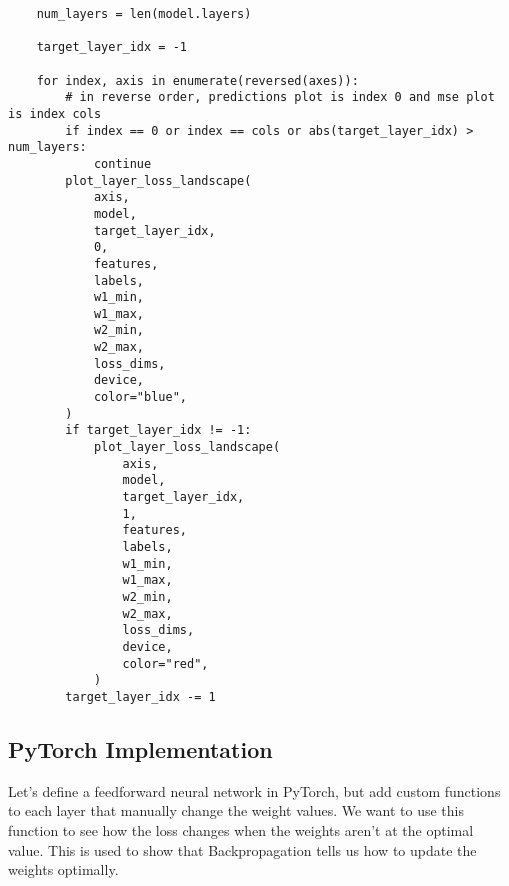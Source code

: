 \documentclass[openany]{book}
\begin{document}
\begin{tcolorbox}
\begin{verbatim}
    num_layers = len(model.layers)

    target_layer_idx = -1

    for index, axis in enumerate(reversed(axes)):
        # in reverse order, predictions plot is index 0 and mse plot is index cols
        if index == 0 or index == cols or abs(target_layer_idx) > num_layers:
            continue
        plot_layer_loss_landscape(
            axis,
            model,
            target_layer_idx,
            0,
            features,
            labels,
            w1_min,
            w1_max,
            w2_min,
            w2_max,
            loss_dims,
            device,
            color="blue",
        )
        if target_layer_idx != -1:
            plot_layer_loss_landscape(
                axis,
                model,
                target_layer_idx,
                1,
                features,
                labels,
                w1_min,
                w1_max,
                w2_min,
                w2_max,
                loss_dims,
                device,
                color="red",
            )
        target_layer_idx -= 1
\end{verbatim}
\end{tcolorbox}

    \subsection{PyTorch Implementation}\label{pytorch-implementation}

Let's define a feedforward neural network in PyTorch, but add custom
functions to each layer that manually change the weight values. We want
to use this function to see how the loss changes when the weights aren't
at the optimal value. This is used to show that Backpropagation tells us
how to update the weights optimally.
\end{document}

